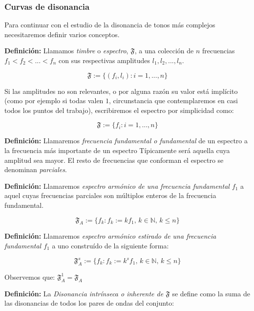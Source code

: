 \documentclass[11pt,a4paper]{article}
\begin{document}
    
    
    
    
    
    \subsubsection{Curvas de disonancia}
    
    Para continuar con el estudio de la disonancia de tonos más complejos necesitaremos definir varios conceptos.
    
    
    \noindent\textbf{Definición:} Llamamos \emph{timbre} o \emph{espectro}, $\mathfrak{F}$, a una colección de $n$ frecuencias $f_1 < f_2 < ... < f_n$ con sus respectivas amplitudes $l_1, l_2,... , l_n$. 
  
    
     $$
        \mathfrak{F} := \{ (f_i, l_i) : i = 1,...,n \}
     $$
        
    Si las amplitudes no son relevantes, o por alguna razón su valor está implícito (como por ejemplo si todas valen $1$, circunstancia que contemplaremos en casi todos los puntos del trabajo), escribiremos el espectro por simplicidad como:
    
    $$
        \mathfrak{F} := \{ f_i : i = 1,... ,n \}
    $$
    
    \noindent\textbf{Definición:} Llamaremos \emph{frecuencia fundamental o fundamental} de un espectro a la frecuencia más importante de un espectro Típicamente será aquella cuya amplitud sea mayor. El resto de frecuencias que conforman el espectro se denominan \emph{parciales}.
      
    \noindent\textbf{Definición:} Llamaremos \emph{espectro armónico de una frecuencia fundamental $f_1$} a aquel cuyas frecuencias parciales son múltiplos enteros de la frecuencia fundamental.
    
    $$
        \mathfrak{F}_{A} := \{ f_k :  f_k := k f_1, \, k \in \mathbb{N}, \, k \leq n \}
    $$
      
    \noindent\textbf{Definición:} Llamaremos \emph{espectro armónico estirado de una frecuencia fundamental $f_1$} a uno construído de la siguiente forma:
    
    $$
        \mathfrak{F}_{A}^{s} := \{ f_k :  f_k := k^{s} f_1, \, k \in \mathbb{N}, \, k \leq n \}
    $$
    
    Observemos que: $ \mathfrak{F}_{A}^{1} = \mathfrak{F}_{A} $
    
    
    \noindent\textbf{Definición:} La  \emph{Disonancia intrínseca o inherente de $\mathfrak{F}$} se define como la suma de las disonancias de todos los pares de ondas del conjunto:
    
\end{document}
